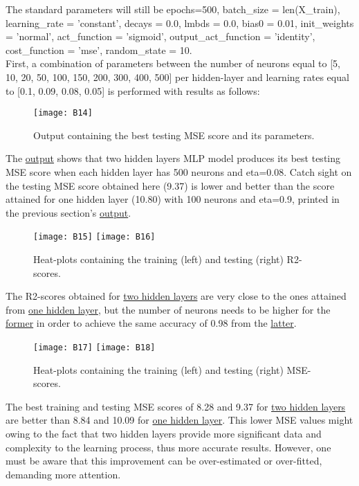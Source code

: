 The standard parameters will still be epochs=500, batch\_size = len(X\_train), learning\_rate = 'constant', decays = 0.0, lmbds = 0.0, bias0 = 0.01, init\_weights = 'normal', act\_function = 'sigmoid', output\_act\_function = 'identity', cost\_function = 'mse', random\_state = 10.\\

First, a combination of parameters between the number of neurons equal to [5, 10, 20, 50, 100, 150, 200, 300, 400, 500] per hidden-layer and learning rates equal to [0.1, 0.09, 0.08, 0.05] is performed with results as follows:

\begin{figure}[H]
\label{fig:B10}
\centering
\texttt{[image: B14]}
\caption{Output containing the best testing MSE score and its parameters.}
\end{figure}

The \hyperref[fig:B10]{output} shows that two hidden layers MLP model produces its best testing MSE score when each hidden layer has 500 neurons and eta=0.08. Catch sight on the testing MSE score obtained here (9.37) is lower and better than the score attained for one hidden layer (10.80) with 100 neurons and eta=0.9, printed in the previous section's \hyperref[fig:B1]{output}.

\begin{figure}[H]
\label{fig:B11}
\centering
\texttt{[image: B15]}
\texttt{[image: B16]}
\caption{Heat-plots containing the training (left) and testing (right) R2-scores.}
\end{figure}

The R2-scores obtained for \hyperref[fig:B11]{two hidden layers} are very close to the ones attained from \hyperref[fig:B2]{one hidden layer}, but the number of neurons needs to be higher for the \hyperref[fig:B11]{former} in order to achieve the same accuracy of 0.98 from the \hyperref[fig:B2]{latter}.

\begin{figure}[H]
\label{fig:B12}
\centering
\texttt{[image: B17]}
\texttt{[image: B18]}
\caption{Heat-plots containing the training (left) and testing (right) MSE-scores.}
\end{figure}

The best training and testing MSE scores of 8.28 and 9.37 for \hyperref[fig:B12]{two hidden layers} are better than 8.84 and 10.09 for \hyperref[fig:B3]{one hidden layer}. This lower MSE values might owing to the fact that two hidden layers provide more significant data and complexity to the learning process, thus more accurate results. However, one must be aware that this improvement can be over-estimated or over-fitted, demanding more attention.


